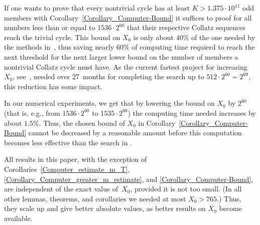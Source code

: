 \documentclass[12pt,reqno]{article}
\begin{document}
\begin{remark}
If one wants to prove that every nontrivial cycle has at least $K> 1.375\cdot 10^{11}$  odd members with  Corollary~\ref{Corollary_Computer-Bound} it suffices to proof for all numbers less than or equal to $1536\cdot 2^{60}$ that their respective Collatz sequences reach the trivial cycle. This bound on $X_0$ is only about 40\% of the one needed by the methods in~\cite{SE}, thus saving nearly 60\% of computing time requierd to reach the next threshold for the next larger lower bound on the number of members a nontrivial Collatz cycle must have. As the current fastest project for increasing $X_0$, see~\cite{Barina-www}, needed over 27~months for completing the search up to $512\cdot2^{60}=2^{69}$, this reduction has some impact.  

In our numerical experiments, we get that by lowering the bound on $X_0$ by $2^{60}$ (that is, e.g., from $1536\cdot 2^{60}$ to $1535\cdot2^{60}$) the computing time needed increases by about $1.5$\%. Thus, the chosen bound of $X_0$ in Corollary~\ref{Corollary_Computer-Bound} cannot be decreased by a reasonable amount before this computation becomes less effective than the search in \cite{Barina-www}.
\end{remark}

\begin{remark}
All results in this paper, with the exception of Corollaries~\ref{Computer_estimate_m_T}, \ref{Corollary_Computer_greater_m_estimate}, and \ref{Corollary_Computer-Bound}, are independent of the exact value of~$X_0$, provided it is not too small. (In all other lemmas, theorems, and corollaries we needed at most $X_0>765$.) Thus, they scale up and give better absolute values, as better results on $X_0$ become available.
\end{remark}
\end{document}
